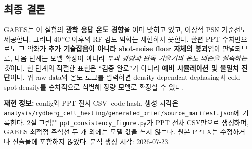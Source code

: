 \documentclass[10pt,a4paper]{article}
\providecommand{\AnalysisGeneratedUTC}{2026-07-23}
\begin{document}
\subsection*{최종 결론}

GABES는 이 실험의 \textbf{광학 응답 온도 경향}을 이미 맞히고 있고, 이상적 PSN 기준선도 제공한다.
그러나 40\,°C 이후의 RF 감도 악화는 재현하지 못한다. 한편 PPT 수치만으로도 그 악화가
\textbf{추가 기술잡음이 아니라 shot-noise floor 자체의 붕괴}임이 판별되므로, 다음 단계는 모델 확장이
아니라 \emph{투과 광량과 판독 기울기의 온도 의존을 실측하는 것}이다. 현 단계의 적절한 표현은
``검증 완료''가 아니라 \textbf{예비 시뮬레이션 및 불일치 진단}이다. 위 raw data와 온도 로그를 입력하면
density-dependent dephasing과 cold-spot density를 순차적으로 식별해 정량 모델로 확장할 수 있다.

\vfill
{\footnotesize
\textbf{재현 정보:} config와 PPT 전사 CSV, code hash, 생성 시각은
\texttt{analysis/rydberg\_cell\_heating/generated\_brief/source\_manifest.json}에 기록한다.
2절 그림은 \texttt{ppt\_consistency\_figure.py}가 PPT 전사 CSV만으로 생성하며,
GABES 최적점 주석선 두 개 외에는 모델 값을 쓰지 않는다.
원본 PPTX는 수정하거나 산출물에 포함하지 않았다. 분석 생성 시각: \AnalysisGeneratedUTC.}
\end{document}
